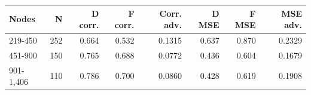 \begin{tabular}{lrrrrrrr}
\toprule
Nodes & N & D corr. & F corr. & Corr. adv. & D MSE & F MSE & MSE adv. \\
\midrule
219-450 & 252 & 0.664 & 0.532 & 0.1315 & 0.637 & 0.870 & 0.2329 \\
451-900 & 150 & 0.765 & 0.688 & 0.0772 & 0.436 & 0.604 & 0.1679 \\
901-1,406 & 110 & 0.786 & 0.700 & 0.0860 & 0.428 & 0.619 & 0.1908 \\
\bottomrule
\end{tabular}
